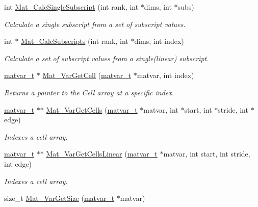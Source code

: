 \begin{DoxyCompactItemize}
int \hyperlink{group__MAT_ga9b8d09f631538b14ca29792e0334e349}{Mat\_\-CalcSingleSubscript} (int rank, int $\ast$dims, int $\ast$subs)
\begin{DoxyCompactList}\small\item\em Calculate a single subscript from a set of subscript values. \item\end{DoxyCompactList}\item 
int $\ast$ \hyperlink{group__MAT_gabe2571a4b9b6cff3b31aa6f152deba61}{Mat\_\-CalcSubscripts} (int rank, int $\ast$dims, int index)
\begin{DoxyCompactList}\small\item\em Calculate a set of subscript values from a single(linear) subscript. \item\end{DoxyCompactList}\item 
\hyperlink{structmatvar__t}{matvar\_\-t} $\ast$ \hyperlink{group__MAT_gac1e15063439c0bd3eb0c986514c742dc}{Mat\_\-VarGetCell} (\hyperlink{structmatvar__t}{matvar\_\-t} $\ast$matvar, int index)
\begin{DoxyCompactList}\small\item\em Returns a pointer to the Cell array at a specific index. \item\end{DoxyCompactList}\item 
\hyperlink{structmatvar__t}{matvar\_\-t} $\ast$$\ast$ \hyperlink{group__MAT_ga0732b0a6c40975b036068b9a14422d45}{Mat\_\-VarGetCells} (\hyperlink{structmatvar__t}{matvar\_\-t} $\ast$matvar, int $\ast$start, int $\ast$stride, int $\ast$edge)
\begin{DoxyCompactList}\small\item\em Indexes a cell array. \item\end{DoxyCompactList}\item 
\hyperlink{structmatvar__t}{matvar\_\-t} $\ast$$\ast$ \hyperlink{group__MAT_ga004987d665654409f74eaf8e82bb1380}{Mat\_\-VarGetCellsLinear} (\hyperlink{structmatvar__t}{matvar\_\-t} $\ast$matvar, int start, int stride, int edge)
\begin{DoxyCompactList}\small\item\em Indexes a cell array. \item\end{DoxyCompactList}\item 
size\_\-t \hyperlink{group__MAT_gaeeb798fead2f765bddfb19016c7fdbcc}{Mat\_\-VarGetSize} (\hyperlink{structmatvar__t}{matvar\_\-t} $\ast$matvar)

\end{DoxyCompactItemize}
